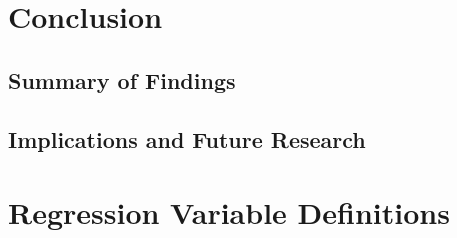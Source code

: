 \documentclass[12pt,a4paper,oneside]{report}
\begin{document}
\chapter{Conclusion}
\label{ch:conclusion}

\section{Summary of Findings}
\label{sec:summary}

\section{Implications and Future Research}
\label{sec:future_research}




\appendix
\chapter{Regression Variable Definitions}
\label{app:variables}
%
\end{document}
